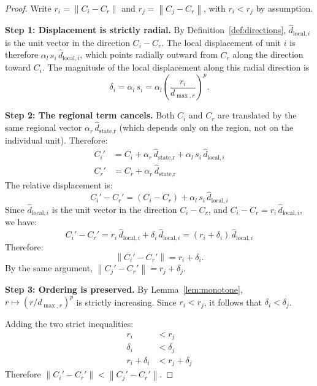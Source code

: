 \documentclass[12pt, a4paper]{article}
\numberwithin{equation}{section}
\theoremstyle{definition}
\theoremstyle{plain}
\theoremstyle{remark}
\newcommand{\norm}[1]{\left\|#1\right\|}
\newcommand{\dhat}[1]{\hat{d}_{\text{#1}}}
\newcommand{\dhati}[1]{\hat{d}_{\text{#1},i}}
\begin{document}
\begin{proof}
Write $r_i = \norm{C_i - C_r}$ and $r_j = \norm{C_j - C_r}$, with $r_i < r_j$ by assumption.

\medskip\noindent\textbf{Step 1: Displacement is strictly radial.}
By Definition~\ref{def:directions}, $\dhati{local}$ is the unit vector in the direction $C_i - C_r$. The local displacement of unit $i$ is therefore $\alpha_l\,s_i\,\dhati{local}$, which points radially outward from $C_r$ along the direction toward $C_i$. The magnitude of the local displacement along this radial direction is
\begin{equation}
  \delta_i = \alpha_l\,s_i = \alpha_l\left(\frac{r_i}{d_{\max,r}}\right)^{\!p}.
  \label{eq:delta_i}
\end{equation}

\medskip\noindent\textbf{Step 2: The regional term cancels.}
Both $C_i$ and $C_r$ are translated by the same regional vector $\alpha_r\,\dhat{state,r}$ (which depends only on the region, not on the individual unit). Therefore:
\begin{align*}
  C_i' &= C_i + \alpha_r\,\dhat{state,r} + \alpha_l\,s_i\,\dhati{local} \\
  C_r' &= C_r + \alpha_r\,\dhat{state,r}
\end{align*}
The relative displacement is:
\begin{equation}
  C_i' - C_r' = (C_i - C_r) + \alpha_l\,s_i\,\dhati{local}
  \label{eq:relative}
\end{equation}
Since $\dhati{local}$ is the unit vector in the direction $C_i - C_r$, and $C_i - C_r = r_i\,\dhati{local}$, we have:
\[
  C_i' - C_r' = r_i\,\dhati{local} + \delta_i\,\dhati{local} = (r_i + \delta_i)\,\dhati{local}
\]
Therefore:
\begin{equation}
  \norm{C_i' - C_r'} = r_i + \delta_i.
  \label{eq:radial_new}
\end{equation}
By the same argument, $\norm{C_j' - C_r'} = r_j + \delta_j$.

\medskip\noindent\textbf{Step 3: Ordering is preserved.}
By Lemma~\ref{lem:monotone}, $r \mapsto (r/d_{\max,r})^p$ is strictly increasing. Since $r_i < r_j$, it follows that $\delta_i < \delta_j$.

Adding the two strict inequalities:
\begin{align*}
  r_i &< r_j \\
  \delta_i &< \delta_j \\
  \hline
  r_i + \delta_i &< r_j + \delta_j
\end{align*}
Therefore $\norm{C_i' - C_r'} < \norm{C_j' - C_r'}$.
\end{proof}
\end{document}
